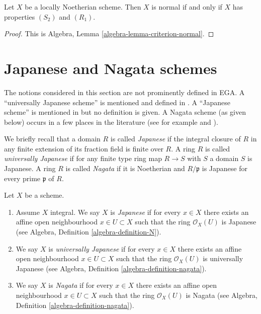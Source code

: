 \begin{lemma}
\label{lemma-criterion-normal}
Let $X$ be a locally Noetherian scheme.
Then $X$ is normal if and only if $X$ has properties $(S_2)$ and $(R_1)$.
\end{lemma}

\begin{proof}
This is Algebra, Lemma \ref{algebra-lemma-criterion-normal}.
\end{proof}






\section{Japanese and Nagata schemes}
\label{section-nagata}

\noindent
The notions considered in this section are not prominently defined in EGA.
A ``universally Japanese scheme'' is mentioned and defined in
\cite[IV Corollary 5.11.4]{EGA}. A ``Japanese scheme'' is mentioned in
\cite[IV Remark 10.4.14 (ii)]{EGA} but no definition is given.
A Nagata scheme (as given below) occurs in a few
places in the literature (see for example \cite[Definition 8.2.30]{Liu} and
\cite[Page 142]{Greco}).

\medskip\noindent
We briefly recall that a domain $R$ is called {\it Japanese} if the integral
closure of $R$ in any finite extension of its fraction field is finite over
$R$. A ring $R$ is called {\it universally Japanese} if for any finite type
ring map $R \to S$ with $S$ a domain $S$ is Japanese. A ring $R$ is called
{\it Nagata} if it is Noetherian and $R/\mathfrak p$ is Japanese for every
prime $\mathfrak p$ of $R$.

\begin{definition}
\label{definition-nagata}
Let $X$ be a scheme.
\begin{enumerate}
\item Assume $X$ integral. We say $X$ is {\it Japanese}
if for every $x \in X$ there exists an
affine open neighbourhood $x \in U \subset X$ such that the ring
$\mathcal{O}_X(U)$ is Japanese (see
Algebra, Definition \ref{algebra-definition-N}).
\item We say $X$ is {\it universally Japanese} if for every $x \in X$
there exists an affine open neighbourhood $x \in U \subset X$ such that
the ring $\mathcal{O}_X(U)$ is universally Japanese (see
Algebra, Definition \ref{algebra-definition-nagata}).
\item We say $X$ is {\it Nagata} if for every $x \in X$ there exists an
affine open neighbourhood $x \in U \subset X$ such that the ring
$\mathcal{O}_X(U)$ is Nagata (see
Algebra, Definition \ref{algebra-definition-nagata}).
\end{enumerate}
\end{definition}

